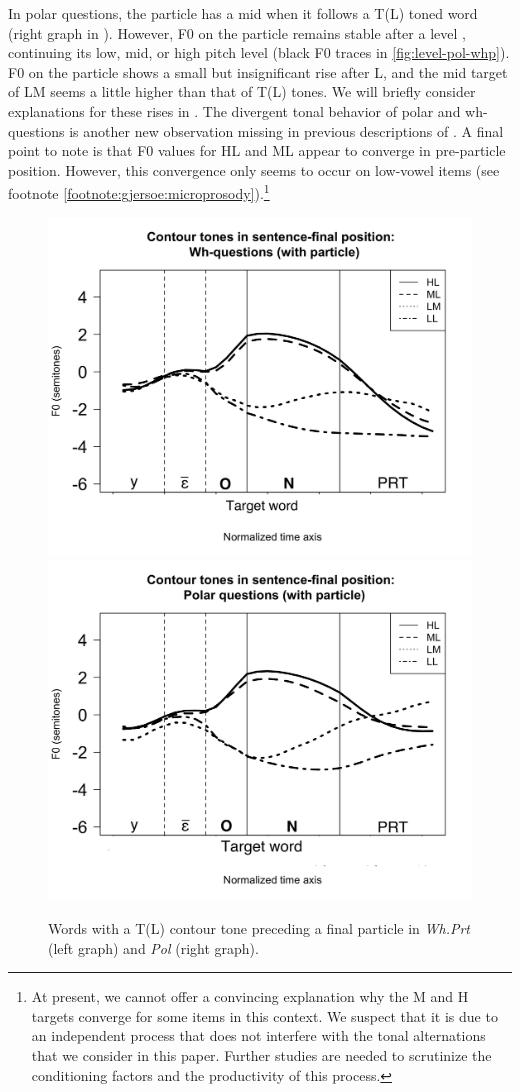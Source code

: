 \documentclass[output=paper,newtxmath,modfonts,nonflat,hidelinks]{langsci/langscibook}
\begin{document}
In polar questions, the particle has a mid  when it follows a T(L) toned word (right graph in ).
However, F0 on the particle remains stable after a level , continuing its low, mid, or high pitch level (black F0 traces in \ref{fig:level-pol-whp}).
F0 on the particle shows a small but insignificant rise after L, and the mid target of LM seems a little higher than that of T(L) tones. We will briefly consider explanations for these rises in .
The divergent tonal behavior of polar and wh-questions is another new observation missing in previous descriptions of .
A final point to note is that F0 values for HL and ML appear to converge in pre-particle position.
However, this convergence only seems to occur on low-vowel items (see footnote \ref{footnote:gjersoe:microprosody}).\footnote{At present, we cannot offer a convincing explanation why the M and H targets converge for some items in this context. We suspect that it is due to an independent process that does not interfere with the tonal alternations that we consider in this paper. Further studies are needed to scrutinize the conditioning factors and the productivity of this process.}
\vspace{-1em}
\begin{figure}[ht!]
\begin{center}
\caption{Words with a T(L) contour tone preceding a final particle in \textit{Wh.Prt} (left graph) and \textit{Pol} (right graph).}
\label{fig:contour-pol-whp}\includegraphics[width=0.45\linewidth]{figures/Contour-Wh1-AllSpeak-MinBirdplus_rep_father_basket_p.png}
\includegraphics[width=0.45\linewidth]{figures/Contour-pol-AllSpeak-MinBirdplus_rep_father_basket_p.png}
\end{center}
\end{figure}
\end{document}
